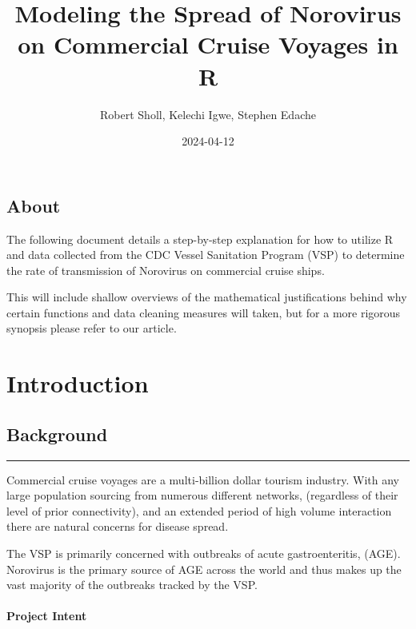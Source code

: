 \documentclass[
  11,
]{book}
\title{Modeling the Spread of Norovirus on Commercial Cruise Voyages in R}
\author{Robert Sholl, Kelechi Igwe, Stephen Edache}
\date{2024-04-12}
\begin{document}
\maketitle

{
\setcounter{tocdepth}{2}
\tableofcontents
}
\hypertarget{about}{%
\chapter*{About}\label{about}}


The following document details a step-by-step explanation for how to utilize R and data collected from the CDC Vessel Sanitation Program (VSP) to determine the rate of transmission of Norovirus on commercial cruise ships.

This will include shallow overviews of the mathematical justifications behind why certain functions and data cleaning measures will taken, but for a more rigorous synopsis please refer to our article.

\hypertarget{part-introduction}{%
\part{Introduction}\label{part-introduction}}

\hypertarget{background}{%
\chapter*{Background}\label{background}}


\begin{center}\rule{0.5\linewidth}{0.5pt}\end{center}

Commercial cruise voyages are a multi-billion dollar tourism industry. With any large population sourcing from numerous different networks, (regardless of their level of prior connectivity), and an extended period of high volume interaction there are natural concerns for disease spread.

The VSP is primarily concerned with outbreaks of acute gastroenteritis, (AGE). Norovirus is the primary source of AGE across the world and thus makes up the vast majority of the outbreaks tracked by the VSP.

\hypertarget{project-intent}{%
\subsection*{Project Intent}\label{project-intent}}
\end{document}
